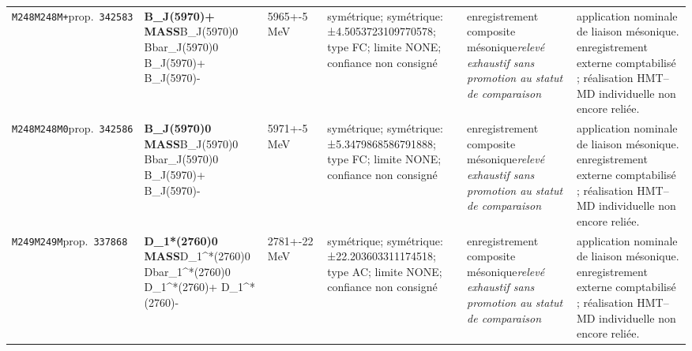 \begin{landscape}
\begin{longtable}{L{1.85cm}L{4.45cm}L{2.35cm}L{4.05cm}L{3.35cm}L{7.15cm}}
\texttt{M248}\newline \texttt{M248M+}\newline prop.\ \texttt{342583} & \textbf{B\_\allowbreak{}J(5970)+ MASS}\newline B\_\allowbreak{}J(5970)0 \textbar{}\allowbreak{} Bbar\_\allowbreak{}J(5970)0 \textbar{}\allowbreak{} B\_\allowbreak{}J(5970)+ \textbar{}\allowbreak{} B\_\allowbreak{}J(5970)- & 5965+-5\,MeV & symétrique; symétrique: ±4.5053723109770578; type FC; limite NONE; confiance non consigné & enregistrement composite mésonique\newline \emph{relevé exhaustif sans promotion au statut de comparaison} & application nominale de liaison mésonique. enregistrement externe comptabilisé ; réalisation HMT--MD individuelle non encore reliée. \\
\texttt{M248}\newline \texttt{M248M0}\newline prop.\ \texttt{342586} & \textbf{B\_\allowbreak{}J(5970)0 MASS}\newline B\_\allowbreak{}J(5970)0 \textbar{}\allowbreak{} Bbar\_\allowbreak{}J(5970)0 \textbar{}\allowbreak{} B\_\allowbreak{}J(5970)+ \textbar{}\allowbreak{} B\_\allowbreak{}J(5970)- & 5971+-5\,MeV & symétrique; symétrique: ±5.3479868586791888; type FC; limite NONE; confiance non consigné & enregistrement composite mésonique\newline \emph{relevé exhaustif sans promotion au statut de comparaison} & application nominale de liaison mésonique. enregistrement externe comptabilisé ; réalisation HMT--MD individuelle non encore reliée. \\
\texttt{M249}\newline \texttt{M249M}\newline prop.\ \texttt{337868} & \textbf{D\_\allowbreak{}1*(2760)0 MASS}\newline D\_\allowbreak{}1\textasciicircum{}*(2760)0 \textbar{}\allowbreak{} Dbar\_\allowbreak{}1\textasciicircum{}*(2760)0 \textbar{}\allowbreak{} D\_\allowbreak{}1\textasciicircum{}*(2760)+ \textbar{}\allowbreak{} D\_\allowbreak{}1\textasciicircum{}*(2760)- & 2781+-22\,MeV & symétrique; symétrique: ±22.203603311174518; type AC; limite NONE; confiance non consigné & enregistrement composite mésonique\newline \emph{relevé exhaustif sans promotion au statut de comparaison} & application nominale de liaison mésonique. enregistrement externe comptabilisé ; réalisation HMT--MD individuelle non encore reliée. \\

\end{longtable}
\end{landscape}
